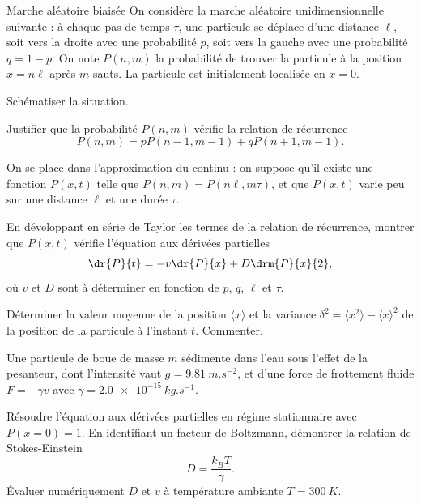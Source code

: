 \begin{exo}[PC][1][colle]{Marche aléatoire biaisée}
  On considère la marche aléatoire unidimensionnelle suivante : à chaque pas de temps $\tau$, une particule se déplace d'une distance $\ell$, soit vers la droite avec une probabilité $p$, soit vers la gauche avec une probabilité $q=1-p$. On note $P(n,m)$ la probabilité de trouver la particule à la position $x=n\ell$ après $m$ sauts. La particule est initialement localisée en $x=0$. 
  \begin{quest}
    \item	Schématiser la situation.
    \item Justifier que la probabilité $P(n,m)$ vérifie la relation de récurrence
    $$
    P(n,m) = p P(n-1,m-1) + q P(n+1,m-1).
    $$
  \end{quest}
  On se place dans l’approximation du continu : on suppose qu’il existe une fonction $P(x,t)$ telle que $P(n,m) = P(n\ell, m\tau)$, et que $P(x,t)$ varie peu sur une distance $\ell$ et une durée $\tau$. 
    \begin{quest}
    \item En développant en série de Taylor les termes de la relation de récurrence, montrer que $P(x,t)$ vérifie l’équation aux dérivées partielles
    $$
    \dr{P}{t} = -v \dr{P}{x} + D \drm{P}{x}{2},
    $$
    où $v$ et $D$ sont à déterminer en fonction de $p$, $q$, $\ell$ et $\tau$.
    \item Déterminer la valeur moyenne de la position $\langle x \rangle$ et la variance $\delta^2 = \langle x^2 \rangle - \langle x\rangle^2$ de la position de la particule à l’instant $t$. Commenter.
  \end{quest}
  Une particule de boue de masse $m$ sédimente dans l’eau sous l’effet de la pesanteur, dont l'intensité vaut $g = \SI{9.81}{m.s^{-2}}$, et d'une force de frottement fluide $F = - \gamma v$ avec $\gamma = \SI{2.0e-15}{kg.s^{-1}}$. 
    \begin{quest}
    \item  Résoudre l’équation aux dérivées partielles en régime stationnaire avec $P(x=0) = 1$. En identifiant un facteur de Boltzmann, démontrer la relation de Stokes-Einstein 
    $$
    D = \frac{k_B T}{\gamma}.
    $$
     Évaluer numériquement $D$ et $v$  à température ambiante $T=\SI{300}{K}$.
  \end{quest}
\end{exo}


